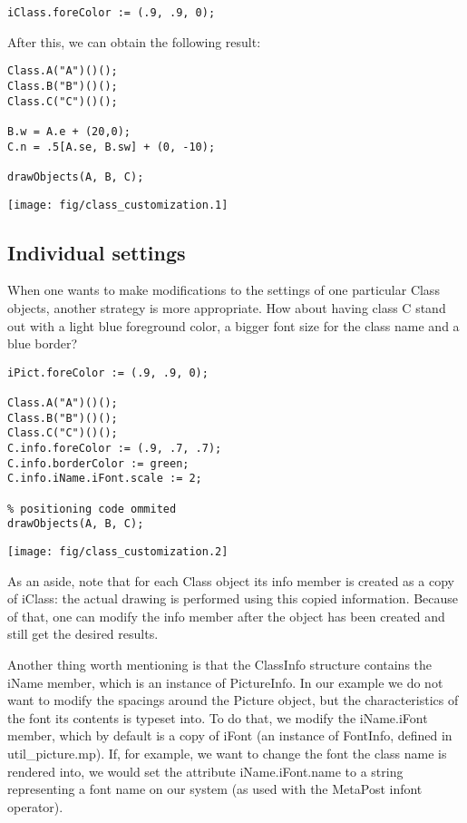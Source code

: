 \documentclass{article}
\newcommand{\code}{\ttfamily}
\begin{document}
\begin{verbatim}
iClass.foreColor := (.9, .9, 0);
\end{verbatim}

After this, we can obtain the following result:

\begin{multicols}{2}
\begin{verbatim}
Class.A("A")()();
Class.B("B")()();
Class.C("C")()();

B.w = A.e + (20,0);
C.n = .5[A.se, B.sw] + (0, -10);

drawObjects(A, B, C);
\end{verbatim}
\columnbreak
\hspace{1cm}\texttt{[image: fig/class\_customization.1]}
\end{multicols}

\subsection{Individual settings}

When one wants to make modifications to the settings of one particular
{\code Class} objects, another strategy is more appropriate. How about having class
{\code C} stand out with a light blue foreground color, a bigger font size for the class name and a blue border?

\pagebreak
\begin{multicols}{2}
\begin{verbatim}
iPict.foreColor := (.9, .9, 0);

Class.A("A")()();
Class.B("B")()();
Class.C("C")()();
C.info.foreColor := (.9, .7, .7);
C.info.borderColor := green;
C.info.iName.iFont.scale := 2;

% positioning code ommited
drawObjects(A, B, C);
\end{verbatim}
\columnbreak
\hspace{1cm}\texttt{[image: fig/class\_customization.2]}
\end{multicols}

As an aside, note that for each {\code Class} object its {\code info} member is created as
a copy of {\code iClass}: the actual drawing is performed using this copied
information. Because of that, one can modify the {\code info} member after the object
has been created and still get the desired results.

Another thing worth mentioning is that the {\code ClassInfo} structure contains
the {\code iName} member, which is an instance of {\code PictureInfo}. In our example we
do not want to modify the spacings around the {\code Picture} object,
but the characteristics of the font its contents is typeset into. To do that,
we modify the {\code iName.iFont} member, which by default is a copy of {\code iFont}
(an instance of {\code FontInfo}, defined in {\code util\_picture.mp}).
If, for example, we want to change the font the class name is rendered into, we would set
the attribute {\code iName.iFont.name} to a string representing a font name
on our system (as used with the MetaPost {\code infont} operator).
\end{document}
